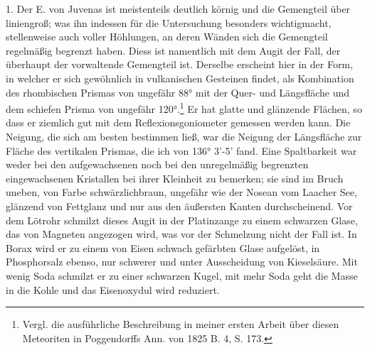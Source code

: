 \documentclass[a4paper, 11pt, oneside]{article}
\begin{document}
1. Der E. von Juvenas ist meistenteils deutlich körnig und die Gemengteil über liniengroß; was ihn indessen für die Untersuchung besonders wichtigmacht, stellenweise auch voller Höhlungen‚ an deren Wänden sich die Gemengteil regelmäßig begrenzt haben. Diess ist namentlich mit dem Augit der Fall, der überhaupt der vorwaltende Gemengteil ist. Derselbe erscheint hier in der Form, in welcher er sich gewöhnlich in vulkanischen Gesteinen findet, als Kombination des rhombischen Prismas von ungefähr 88° mit der Quer- und Längsfläche und dem schiefen Prisma von ungefähr 120°.\footnote{Vergl. die ausführliche Beschreibung in meiner ersten Arbeit über diesen Meteoriten in Poggendorffs Ann. von 1825 B. 4, S. 173.} Er hat glatte und glänzende Flächen, so dass er ziemlich gut mit dem Reflexionsgoniometer gemessen werden kann. Die Neigung, die sich am besten bestimmen ließ, war die Neigung der Längsfläche zur Fläche des vertikalen Prismas, die ich von 136° 3’-5’ fand. Eine Spaltbarkeit war weder bei den aufgewachsenen noch bei den unregelmäßig begrenzten eingewachsenen Kristallen bei ihrer Kleinheit zu bemerken; sie sind im Bruch uneben, von Farbe schwärzlichbraun, ungefähr wie der Nosean vom Laacher See, glänzend von Fettglanz und nur aus den äußersten Kanten durchscheinend. Vor dem Lötrohr schmilzt dieses Augit in der Platinzange zu einem schwarzen Glase, das von Magneten angezogen wird, was vor der Schmelzung nicht der Fall ist. In Borax wird er zu einem von Eisen schwach gefärbten Glase aufgelöst, in Phosphorsalz ebenso, nur schwerer und unter Ausscheidung von Kieselsäure. Mit wenig Soda schmilzt er zu einer schwarzen Kugel, mit mehr Soda geht die Masse in die Kohle und das Eisenoxydul wird reduziert.
\end{document}
